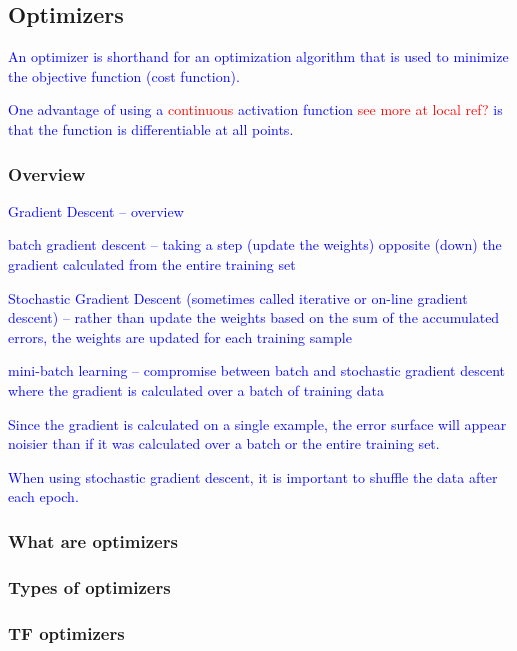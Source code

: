 \subsection{Optimizers}

\textcolor{blue}{An optimizer is shorthand for an optimization algorithm that is used to minimize the objective function (cost function).}
	
\textcolor{blue}{One advantage of using a \textcolor{red}{continuous} activation function \textcolor{red}{see more at local ref?} is that the function is differentiable at all points. }

\subsubsection{Overview}

\textcolor{blue}{Gradient Descent -- overview}

\textcolor{blue}{batch gradient descent -- taking a step (update the weights) opposite (down) the gradient calculated from the entire training set}

\textcolor{blue}{Stochastic Gradient Descent (sometimes called iterative or on-line gradient descent) -- rather than update the weights based on the sum of the accumulated errors, the weights are updated for each training sample}

\textcolor{blue}{mini-batch learning -- compromise between batch and stochastic gradient descent where the gradient is calculated over a batch of training data}

\textcolor{blue}{Since the gradient is calculated on a single example, the error surface will appear noisier than if it was calculated over a batch or the entire training set.}

\textcolor{blue}{When using stochastic gradient descent, it is important to shuffle the data after each epoch.}

\subsubsection{What are optimizers}

\subsubsection{Types of optimizers}

\subsubsection{TF optimizers}

